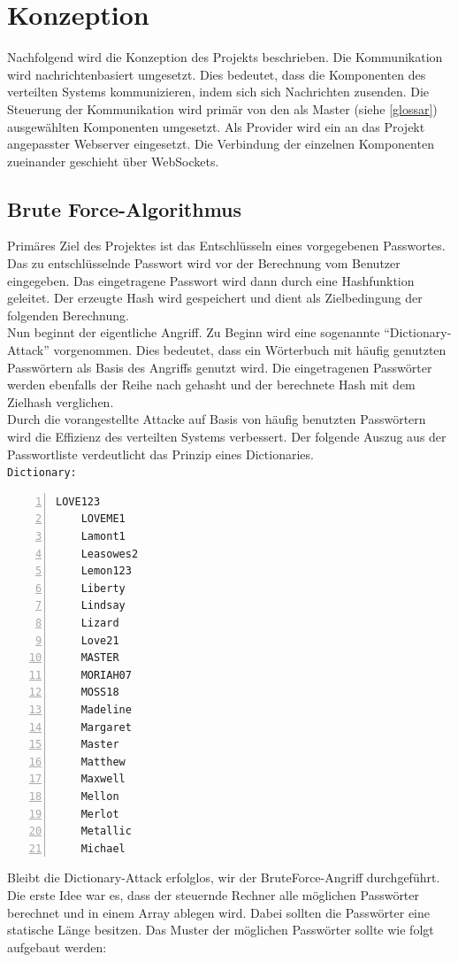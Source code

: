 \chapter{Konzeption}
\label{Konzeption}
Nachfolgend wird die Konzeption des Projekts beschrieben. 
Die Kommunikation wird nachrichtenbasiert umgesetzt. Dies bedeutet, dass die Komponenten des verteilten Systems kommunizieren, indem sich sich Nachrichten zusenden. Die Steuerung der Kommunikation wird primär von den als Master 
(siehe \ref{glossar}) ausgewählten Komponenten umgesetzt. Als Provider wird ein an das Projekt angepasster Webserver eingesetzt. Die Verbindung der einzelnen Komponenten zueinander geschieht über WebSockets. \\


\section{Brute Force-Algorithmus}
\label{ideeBruteForce}
Primäres Ziel des Projektes ist das Entschlüsseln eines vorgegebenen Passwortes. Das zu entschlüsselnde Passwort wird vor der Berechnung vom Benutzer eingegeben. Das eingetragene Passwort wird dann durch eine Hashfunktion geleitet. Der erzeugte Hash wird gespeichert und dient als Zielbedingung der folgenden Berechnung. \\
Nun beginnt der eigentliche Angriff. Zu Beginn wird eine sogenannte \enquote{Dictionary-Attack} vorgenommen. Dies bedeutet, dass ein Wörterbuch mit häufig genutzten Passwörtern als Basis des Angriffs genutzt wird. Die eingetragenen Passwörter werden ebenfalls der Reihe nach gehasht und der berechnete Hash mit dem Zielhash verglichen. \\
 Durch die vorangestellte Attacke auf Basis von häufig benutzten Passwörtern wird die Effizienz des verteilten Systems verbessert. Der folgende Auszug aus der Passwortliste  verdeutlicht das Prinzip eines Dictionaries. \\
 \newpage
\texttt{Dictionary:}
\begin{lstlisting}[basicstyle=\ttfamily,numbers=left,numberstyle=\footnotesize\ttfamily,backgroundcolor=\color{sourcegray}]
	LOVE123
	LOVEME1
	Lamont1
	Leasowes2
	Lemon123
	Liberty
	Lindsay
	Lizard
	Love21
	MASTER
	MORIAH07
	MOSS18
	Madeline
	Margaret
	Master
	Matthew
	Maxwell
	Mellon
	Merlot
	Metallic
	Michael
\end{lstlisting}



Bleibt die Dictionary-Attack erfolglos, wir der BruteForce-Angriff durchgeführt. \\
Die erste Idee war es, dass der steuernde Rechner alle möglichen Passwörter berechnet und in einem Array ablegen wird. Dabei sollten die Passwörter eine statische Länge besitzen. Das Muster der möglichen Passwörter sollte wie folgt aufgebaut werden: \\

